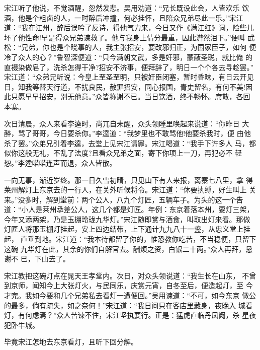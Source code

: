 宋江听了他说，不觉酒醒，忽然发悲。吴用劝道：“兄长既设此会，人皆欢乐
饮酒，他是个粗卤的人，一时醉后冲撞，何必挂怀，且陪众兄弟尽此一乐。”宋江
道：“我在江州，醉后误吟了反诗，得他气力来，今日又作《满江红》词，险些儿
坏了他性命!早是得众兄弟谏救了。他与我身上情分最重，因此潸然泪下。”便叫
武松：“兄弟，你也是个晓事的人，我主张招安，要改邪归正，为国家臣子，如何
便冷了众人的心？”鲁智深便道：“只今满朝文武，多是奸邪，蒙蔽圣聪，就比俺
的直裰染做皂了，洗杀怎得干净?招安不济事，便拜辞了，明日一个个各去寻趁罢。”
宋江道：“众弟兄听说：今皇上至圣至明，只被奸臣闭塞，暂时昏昧，有日云开见
日，知我等替天行道，不扰良民，赦罪招安，同心报国，青史留名，有何不美!因
此只愿早早招安，别无他意。”众皆称谢不已。当日饮酒，终不畅怀。席散，各回
本寨。

次日清晨，众人来看李逵时，尚兀自未醒，众头领睡里唤起来说道：“你昨日
大醉，骂了哥哥，今日要杀你。”李逵道：“我梦里也不敢骂他!他要杀我时，便
由他杀了罢。”众弟兄引着李逵，去堂上见宋江请罪。宋江喝道：“我手下许多人
马，都似你这般无礼，不乱了法度?且看众兄弟之面，寄下你项上一刀，再犯必不
轻恕。”李逵喏喏连声而退，众人皆散。

一向无事，渐近岁终。那一日久雪初晴，只见山下有人来报，离寨七八里，拿
得莱州解灯上东京去的一行人，在关外听候将令。宋江道：“休要执缚，好生叫上
关来。”没多时，解到堂前：两个公人，八九个灯匠，五辆车子。为头的这一个告
道：“小人是莱州承差公人，这几个都是灯匠。年例：东京着落本州，要灯三架，
今年又添两架，乃是玉棚玲珑九华灯。”宋江随即赏与酒食，叫取出灯来看。那做
灯匠人将那玉棚灯挂起，安上四边结带，上下通计九九八十一盏，从忠义堂上挂起，
直垂到地。宋江道：“我本待都留了你的，惟恐教你吃苦，不当稳便，只留下这碗
九华灯在此，其余的你们自解官去。酬烦之资，白银二十两。”众人再拜，恳谢不
已，下山去了。

宋江教把这碗灯点在晁天王孝堂内。次日，对众头领说道：“我生长在山东，
不曾到京师，闻知今上大张灯火，与民同乐，庆赏元宵，自冬至后，便造起灯，至
今才完。我如今要和几个兄弟私去看灯一遭便回。”吴用谏道：“不可，如今东京
做公的最多，倘有疏失，如之奈何！”宋江道：“我日间只在客店里藏身，夜晚入
城看灯，有何虑焉？”众人苦谏不住，宋江坚执要行。正是：猛虎直临丹凤阙，杀
星夜犯卧牛城。

毕竟宋江怎地去东京看灯，且听下回分解。